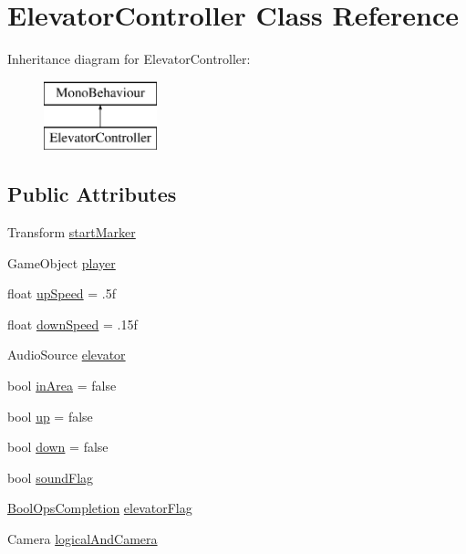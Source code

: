 \hypertarget{class_elevator_controller}{}\section{Elevator\+Controller Class Reference}
\label{class_elevator_controller}
Inheritance diagram for Elevator\+Controller\+:\begin{figure}[H]
\begin{center}
\leavevmode
\includegraphics[height=2.000000cm]{class_elevator_controller}
\end{center}
\end{figure}
\subsection*{Public Attributes}
\begin{DoxyCompactItemize}
\item 
Transform \hyperlink{class_elevator_controller_a6e7efcdcf445a847b7d3409662cce3f1}{start\+Marker}
\item 
Game\+Object \hyperlink{class_elevator_controller_a0a95ba162783ed8f0ef35e5ba9494fc6}{player}
\item 
float \hyperlink{class_elevator_controller_a9a5b319532f7be14eeee9d45cf21f695}{up\+Speed} = .\+5f
\item 
float \hyperlink{class_elevator_controller_a127024ceeb58e782d98e76c29c785bd7}{down\+Speed} = .\+15f
\item 
Audio\+Source \hyperlink{class_elevator_controller_ab5b5244289dd36e6a4e480f9cf4269c0}{elevator}
\item 
bool \hyperlink{class_elevator_controller_a092a7e98dc1ca5ccaee15195746f0b59}{in\+Area} = false
\item 
bool \hyperlink{class_elevator_controller_aff0b538f1ab6bf0759c7fde9fcc1fb38}{up} = false
\item 
bool \hyperlink{class_elevator_controller_a10f89ddcc125d36c4bc7958ed94ad2ef}{down} = false
\item 
bool \hyperlink{class_elevator_controller_ab957a12ff569718351939c9b947071a6}{sound\+Flag}
\item 
\hyperlink{class_bool_ops_completion}{Bool\+Ops\+Completion} \hyperlink{class_elevator_controller_a3c7120c81b5845ad6a56167e5a372b38}{elevator\+Flag}
\item 
Camera \hyperlink{class_elevator_controller_af00b8987026003654213434dfd06817e}{logical\+And\+Camera}
\end{DoxyCompactItemize}


